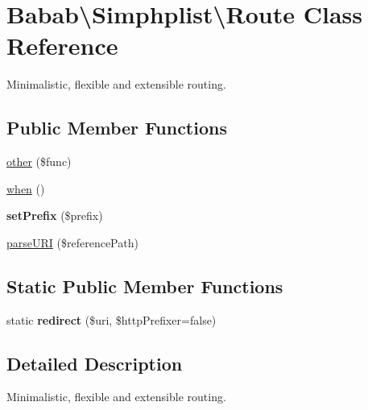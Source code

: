 \hypertarget{classBabab_1_1Simphplist_1_1Route}{\section{Babab\textbackslash{}Simphplist\textbackslash{}Route Class Reference}
\label{classBabab_1_1Simphplist_1_1Route}
}


Minimalistic, flexible and extensible routing.  


\subsection*{Public Member Functions}
\begin{DoxyCompactItemize}
\item 
\hyperlink{classBabab_1_1Simphplist_1_1Route_a998abb044d2a0d1ef2b2c1bc727c475e}{other} (\$func)
\item 
\hyperlink{classBabab_1_1Simphplist_1_1Route_ae51d0a0c3732e3778fa02ef0c3ca2d54}{when} ()
\item 
\hypertarget{classBabab_1_1Simphplist_1_1Route_a04976cbc3bec89b44e23616abf61753e}{{\bfseries set\+Prefix} (\$prefix)}\label{classBabab_1_1Simphplist_1_1Route_a04976cbc3bec89b44e23616abf61753e}

\item 
\hyperlink{classBabab_1_1Simphplist_1_1Route_a081a289530000948636ab410e682f335}{parse\+U\+R\+I} (\$reference\+Path)
\end{DoxyCompactItemize}
\subsection*{Static Public Member Functions}
\begin{DoxyCompactItemize}
\item 
\hypertarget{classBabab_1_1Simphplist_1_1Route_a295f532ff277469fb2560be8333e9d2b}{static {\bfseries redirect} (\$uri, \$http\+Prefixer=false)}\label{classBabab_1_1Simphplist_1_1Route_a295f532ff277469fb2560be8333e9d2b}

\end{DoxyCompactItemize}


\subsection{Detailed Description}
Minimalistic, flexible and extensible routing. 

